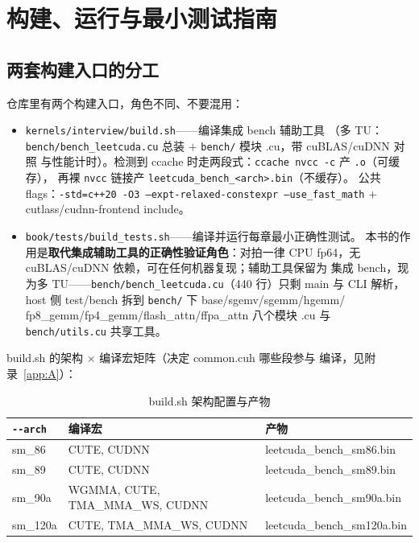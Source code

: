 \chapter{构建、运行与最小测试指南}\label{app:C}

\section{两套构建入口的分工}

仓库里有两个构建入口，角色不同、不要混用：

\begin{itemize}
  \item \texttt{kernels/\allowbreak{}interview/\allowbreak{}build.\allowbreak{}sh}——编译集成 bench 辅助工具
        （多 TU：\texttt{bench/bench\_leetcuda.cu} 总装 $+$ \texttt{bench/} 模块 .cu，带 cuBLAS/cuDNN 对照
        与性能计时）。检测到
        ccache 时走两段式：\texttt{ccache nvcc -c} 产 \texttt{.o}（可缓存），
        再裸 \texttt{nvcc} 链接产 \texttt{leetcuda\_\allowbreak{}bench\_\allowbreak{}<arch>.\allowbreak{}bin}（不缓存）。
        公共 flags：\texttt{-std=\allowbreak{}c++20 -O3 --expt-relaxed-constexpr
        --use\_\allowbreak{}fast\_\allowbreak{}math} + cutlass/cudnn-frontend include。
  \item \texttt{book/\allowbreak{}tests/\allowbreak{}build\_\allowbreak{}tests.\allowbreak{}sh}——编译并运行每章最小正确性测试。
        本书的作用是\textbf{取代集成辅助工具的正确性验证角色}：对拍一律
        CPU fp64，无 cuBLAS/cuDNN 依赖，可在任何机器复现；辅助工具保留为
        集成 bench，现为多 TU——\texttt{bench/bench\_leetcuda.cu}（440 行）只剩 main 与
        CLI 解析，host 侧 test/bench 拆到 \texttt{bench/} 下 base/sgemv/sgemm/hgemm/
        fp8\_gemm/fp4\_gemm/flash\_attn/ffpa\_attn 八个模块 .cu 与
        \texttt{bench/utils.cu} 共享工具。
\end{itemize}

\noindent build.sh 的架构 $\times$ 编译宏矩阵（决定 common.cuh 哪些段参与
编译，见附录~\ref{app:A}）：

\begin{table}[htbp]
\centering\small
\caption{build.sh 架构配置与产物}\label{tab:appC-archdef}
\begin{tabular}{lll}
\toprule
\texttt{-{}-arch} & 编译宏 & 产物 \\
\midrule
sm\_86 & CUTE, CUDNN & leetcuda\_bench\_sm86.bin \\
sm\_89 & CUTE, CUDNN & leetcuda\_bench\_sm89.bin \\
sm\_90a & WGMMA, CUTE, TMA\_MMA\_WS, CUDNN & leetcuda\_bench\_sm90a.bin \\
sm\_120a & CUTE, TMA\_MMA\_WS, CUDNN & leetcuda\_bench\_sm120a.bin \\
\bottomrule
\end{tabular}
\end{table}

